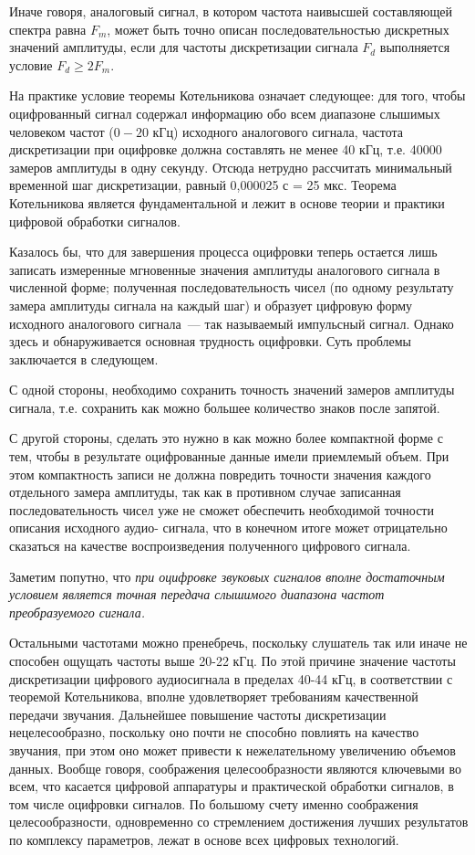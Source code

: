\documentclass[oneside, final, 14pt]{extreport}
\begin{document}
Иначе говоря, аналоговый сигнал, в котором частота наивысшей составляющей спектра равна $F_m$, может быть точно описан последовательностью дискретных значений амплитуды, если для частоты дискретизации сигнала $F_d$ выполняется условие $F_d\geq2F_m$. 

На практике условие теоремы Котельникова означает следующее: для того, чтобы оцифрованный сигнал содержал информацию обо всем диапазоне слышимых человеком частот ($0 - 20$ кГц) исходного аналогового сигнала, частота дискретизации при оцифровке должна составлять не менее 40 кГц, т.е. 40000 замеров амплитуды в одну секунду. Отсюда нетрудно рассчитать минимальный временной шаг дискретизации, равный 0,000025 с = 25 мкс. Теорема Котельникова является фундаментальной и лежит в основе теории и практики цифровой обработки сигналов.

Казалось бы, что для завершения процесса оцифровки теперь остается лишь записать измеренные мгновенные значения амплитуды аналогового сигнала в численной форме; полученная последовательность чисел (по одному результату замера амплитуды сигнала на каждый шаг) и образует цифровую форму исходного аналогового сигнала~--- так называемый импульсный сигнал. Однако здесь и обнаруживается основная трудность оцифровки. Суть проблемы заключается в следующем.

С одной стороны, необходимо сохранить точность значений замеров амплитуды сигнала, т.е. сохранить как можно большее количество знаков после запятой.

С другой стороны, сделать это нужно в как можно более компактной форме с тем, чтобы в результате оцифрованные данные имели приемлемый объем. При этом компактность записи не должна повредить точности значения каждого отдельного замера амплитуды, так как в противном случае записанная последовательность чисел уже не сможет обеспечить необходимой точности описания исходного аудио-
сигнала, что в конечном итоге может отрицательно сказаться на качестве воспроизведения полученного цифрового сигнала.

Заметим попутно, что \emph{при оцифровке звуковых сигналов вполне достаточным условием является точная передача слышимого диапазона частот преобразуемого сигнала.}

Остальными частотами можно пренебречь, поскольку слушатель так или иначе не способен ощущать частоты выше 20-22 кГц. По этой причине значение частоты дискретизации цифрового аудиосигнала в пределах 40-44 кГц, в соответствии с теоремой Котельникова, вполне удовлетворяет требованиям качественной
передачи звучания. Дальнейшее повышение частоты дискретизации нецелесообразно, поскольку оно почти не способно повлиять на качество звучания, при этом оно может привести к нежелательному увеличению объемов данных. Вообще говоря, соображения целесообразности являются ключевыми во всем, что касается
цифровой аппаратуры и практической обработки сигналов, в том числе оцифровки сигналов. По большому счету именно соображения целесообразности, одновременно со стремлением достижения лучших результатов по комплексу параметров, лежат в основе всех цифровых технологий.
\end{document}
